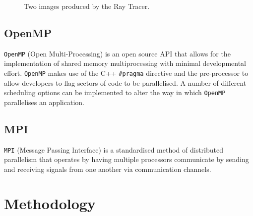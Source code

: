 \documentclass[journal,transmag]{IEEEtran}
\begin{document}
			\begin{figure}[]
				\centering
				\hfil
				\caption{Two images produced by the Ray Tracer.}
				\label{fig_sim}
			\end{figure}
		
	\subsection{OpenMP}
		\texttt{OpenMP} (Open Multi-Processing) is an open source API that allows for the implementation of shared memory multiprocessing with minimal developmental effort. \texttt{OpenMP} makes use of the C++ \texttt{\#pragma} directive and the pre-processor to allow developers to flag sectors of code to be parallelised. A number of different scheduling options can be implemented to alter the way in which \texttt{OpenMP} parallelises an application.

	\subsection{MPI}
		\texttt{MPI} (Message Passing Interface) is a standardised method of distributed parallelism that operates by having multiple processors communicate by sending and receiving signals from one another via communication channels. 
		
\section{Methodology}
	
\end{document}
